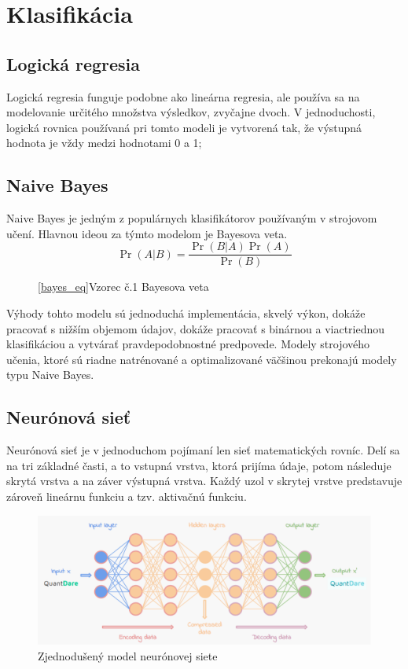 \documentclass[8pt,twoside,slovak,a4paper]{article}
\begin{document}
\section{Klasifikácia}
\subsection{Logická regresia}
Logická regresia funguje podobne ako lineárna regresia, ale používa sa na modelovanie určitého množstva výsledkov, zvyčajne dvoch. V jednoduchosti, logická rovnica používaná pri tomto modeli je vytvorená tak, že výstupná hodnota je vždy medzi hodnotami 0 a 1;
\subsection{Naive Bayes}
Naive Bayes je jedným z populárnych klasifikátorov používaným v strojovom učení. Hlavnou ideou za týmto modelom je Bayesova veta.
\begin{equation} \label{bayes_eq}
 \Pr(A|B)=\frac{\Pr(B|A)\Pr(A)}{\Pr(B)}
\end{equation}
\begin{figure}[h]
\centering
\ref{bayes_eq}Vzorec č.1  Bayesova veta \cite{bayes_equation}
\end{figure}
\newline Výhody tohto modelu sú jednoduchá implementácia, skvelý výkon, dokáže pracovať s nižším objemom údajov, dokáže pracovať s binárnou a viactriednou klasifikáciou a vytvárať pravdepodobnostné predpovede. \newline \hspace*{0.4cm} Modely strojového učenia, ktoré sú riadne natrénované a optimalizované väčšinou prekonajú modely typu Naive Bayes. \cite{quick_review}
\subsection{Neurónová sieť} 
Neurónová sieť je v jednoduchom pojímaní len sieť matematických rovníc. Delí sa na tri základné časti, a to vstupná vrstva, ktorá prijíma údaje, potom následuje skrytá vrstva a na záver výstupná vrstva. Každý uzol v skrytej vrstve predstavuje zároveň lineárnu funkciu a tzv. aktivačnú funkciu.
\begin{figure}[h] 
\centering
\includegraphics[scale=0.4]{neural_network_img}
\caption{Zjednodušený model neurónovej siete \cite{neural_network_image}}
\end{figure}
\newpage
\end{document}
